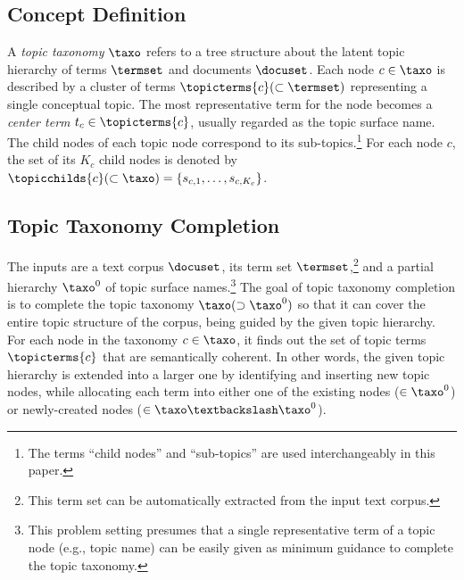 
\subsection{Concept Definition}
\label{subsec:definition}

\begin{definition}
A \textit{topic taxonomy} $\taxo$ refers to a tree structure about the latent topic hierarchy of terms $\termset$ and documents $\docuset$.
Each node $c\in\taxo$ is described by a cluster of terms $\topicterms{c} (\subset \termset)$ representing a single conceptual topic.
The most representative term for the node becomes a \textit{center term} $t_{c}\in\topicterms{c}$, usually regarded as the topic surface name.
The child nodes of each topic node correspond to its sub-topics.\footnote{The terms ``child nodes'' and ``sub-topics'' are used interchangeably in this paper.}
For each node $c$, the set of its $K_c$ child nodes is denoted by $\topicchilds{c} (\subset\taxo) = \{s_{c,1}, \ldots, s_{c,K_c}\}$.
\end{definition}

\subsection{Topic Taxonomy Completion}
\label{subsec:problem}
\begin{definition}
The inputs are a text corpus $\docuset$, its term set $\termset$,\footnote{This term set can be automatically extracted from the input text corpus.}
and a partial hierarchy $\taxo^0$ of topic surface names.\footnote{This problem setting presumes that a single representative term of a topic node (e.g., topic name) can be easily given as minimum guidance to complete the topic taxonomy.}
The goal of topic taxonomy completion is to complete the topic taxonomy $\taxo(\supset\taxo^0)$ so that it can cover the entire topic structure of the corpus, being guided by the given topic hierarchy.
For each node in the taxonomy $c\in\taxo$, it finds out the set of topic terms $\topicterms{c}$ that are semantically coherent.
In other words, the given topic hierarchy is extended into a larger one by identifying and inserting new topic nodes, while allocating each term into either one of the existing nodes ($\in\taxo^0$) or newly-created nodes ($\in\taxo\textbackslash\taxo^0$).
\end{definition}

